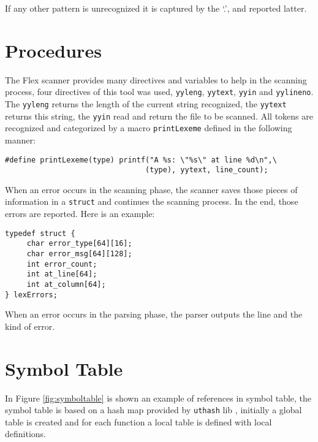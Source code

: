 \documentclass{article}
\begin{document}
If any other pattern is unrecognized it is captured by the `.', and reported
latter.

\section{Procedures}
\label{sec:proc}
The Flex scanner provides many directives and variables to help in the scanning
process, four directives of this tool was used, \texttt{yyleng},
\texttt{yytext}, \texttt{yyin} and \texttt{yylineno}. The \texttt{yyleng}
returns the length of the current string recognized, the \texttt{yytext}
returns this string, the \texttt{yyin} read and return the file to be scanned.
All tokens are recognized and categorized by a macro \texttt{printLexeme}
defined in the following manner:

\begin{verbatim}
#define printLexeme(type) printf("A %s: \"%s\" at line %d\n",\
                                (type), yytext, line_count);
\end{verbatim}

When an error occurs in the scanning phase, the scanner saves those pieces of
information in a \texttt{struct} and continues the scanning process. In the
end, those errors are reported. Here is an example:

\begin{verbatim}
typedef struct {
     char error_type[64][16];
     char error_msg[64][128];
     int error_count;
     int at_line[64];
     int at_column[64];
} lexErrors;
\end{verbatim}

When an error occurs in the parsing phase, the parser outputs the line and the
kind of error.

\section{Symbol Table}
\label{sec:symtable}
In Figure \ref{fig:symboltable} is shown an example of references in symbol
table, the symbol table is based on a hash map provided by \texttt{uthash} lib
\cite{hanson2013uthash}, initially a global table is created and for each
function a local table is defined with local definitions.
\end{document}
